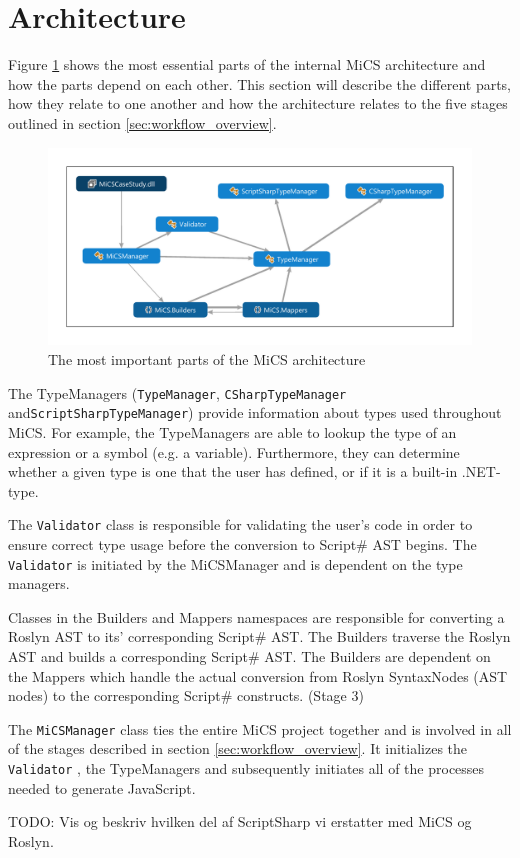\section{Architecture} %
\label{sec:architecture}
Figure \ref{fig:dependencygraph} shows the most essential parts of the internal MiCS architecture and how the parts depend on each other. 
This section will describe the different parts, how they relate to one another and how the architecture relates to the five stages outlined in section \ref{sec:workflow_overview}. 

\begin{figure}
	\begin{center}
		\centerline{\includegraphics[width=18cm]{resources/images/dependencygraph.pdf}}
	\end{center}
	\caption{The most important parts of the MiCS architecture}
	\label{fig:dependencygraph}
\end{figure}


The TypeManagers (\texttt{TypeManager}, \texttt{CSharpTypeManager} and\newline \texttt{ScriptSharpTypeManager}) provide information about types used throughout MiCS. For example, the TypeManagers are able to lookup the type of an expression or a symbol (e.g. a variable). Furthermore, they can determine whether a given type is one that the user has defined, or if it is a built-in .NET-type.

The \texttt{Validator} class is responsible for validating the user's code in order to ensure correct type usage before the conversion to Script\# AST begins. The \texttt{Validator} is initiated by the MiCSManager and is dependent on the type managers.

Classes in the Builders and Mappers namespaces are responsible for converting a Roslyn AST to its' corresponding Script\# AST. The Builders traverse the Roslyn AST and builds a corresponding Script\# AST. The Builders are dependent on the Mappers which handle the actual conversion from Roslyn SyntaxNodes (AST nodes) to the corresponding Script\# constructs. (Stage 3)

The \texttt{MiCSManager} class ties the entire MiCS project together and is involved in all of the stages described in section \ref{sec:workflow_overview}. It initializes the \texttt{Validator} ,  the TypeManagers and subsequently initiates all of the processes needed to generate JavaScript. 

TODO: Vis og beskriv hvilken del af ScriptSharp vi erstatter med MiCS og Roslyn.


